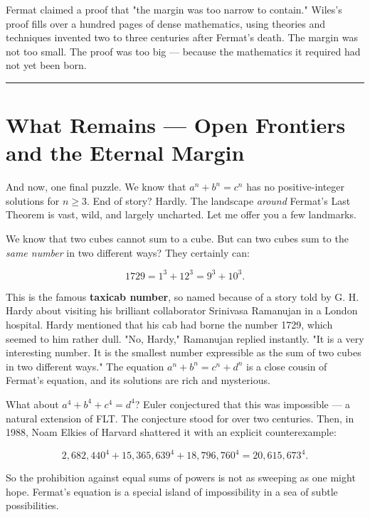 \documentclass[11pt,openany]{book}
\theoremstyle{definition}
\theoremstyle{plain}
\theoremstyle{remark}
\begin{document}
Fermat claimed a proof that "the margin was too narrow to contain." Wiles's proof fills over a hundred pages of dense mathematics, using theories and techniques invented two to three centuries after Fermat's death. The margin was not too small. The proof was too big — because the mathematics it required had not yet been born.

\bigskip\noindent\rule{\textwidth}{0.4pt}\bigskip


\section*{What Remains — Open Frontiers and the Eternal Margin}


And now, one final puzzle. We know that $a^n + b^n = c^n$ has no positive-integer solutions for $n \ge 3$. End of story? Hardly. The landscape \textit{around} Fermat's Last Theorem is vast, wild, and largely uncharted. Let me offer you a few landmarks.

We know that two cubes cannot sum to a cube. But can two cubes sum to the \textit{same number} in two different ways? They certainly can:

$$1729 = 1^3 + 12^3 = 9^3 + 10^3.$$

This is the famous \textbf{taxicab number}, so named because of a story told by G. H. Hardy about visiting his brilliant collaborator Srinivasa Ramanujan in a London hospital. Hardy mentioned that his cab had borne the number 1729, which seemed to him rather dull. "No, Hardy," Ramanujan replied instantly. "It is a very interesting number. It is the smallest number expressible as the sum of two cubes in two different ways." The equation $a^n + b^n = c^n + d^n$ is a close cousin of Fermat's equation, and its solutions are rich and mysterious.

What about $a^4 + b^4 + c^4 = d^4$? Euler conjectured that this was impossible — a natural extension of FLT. The conjecture stood for over two centuries. Then, in 1988, Noam Elkies of Harvard shattered it with an explicit counterexample:

$$2{,}682{,}440^4 + 15{,}365{,}639^4 + 18{,}796{,}760^4 = 20{,}615{,}673^4.$$

So the prohibition against equal sums of powers is not as sweeping as one might hope. Fermat's equation is a special island of impossibility in a sea of subtle possibilities.
\end{document}
